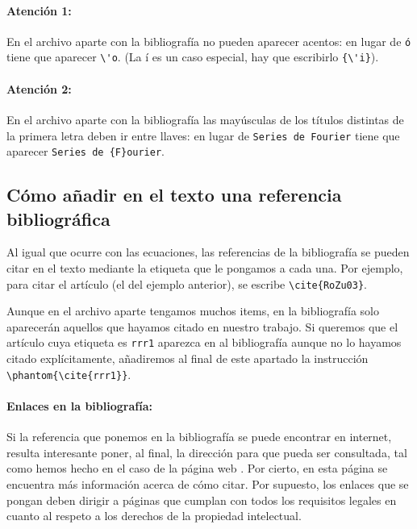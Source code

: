 \documentclass[a4paper,12pt]{article}
\begin{document}
{\paragraph{Atención 1:} En el archivo aparte con la bibliografía no pueden aparecer acentos: en lugar de \verb|ó| tiene que aparecer \verb|\'o|. (La í es un caso especial, hay que escribirlo \verb|{\'i}|).
\paragraph{Atención 2:}  En el archivo aparte con la bibliografía  las mayúsculas de los títulos distintas de la primera letra deben ir entre llaves: en lugar de \verb|Series de Fourier| tiene que aparecer \verb|Series de {F}ourier|.

\subsection{Cómo añadir en el texto una referencia bibliográfica}


Al igual que ocurre con las ecuaciones, las referencias de la bibliografía se pueden citar en el texto mediante la etiqueta que le pongamos a cada una. Por ejemplo, para citar el artículo \cite{RoZu03} (el del ejemplo anterior),  se escribe \verb|\cite{RoZu03}|.

Aunque en el archivo aparte tengamos muchos items, en la bibliografía solo aparecerán aquellos que hayamos citado en nuestro trabajo. 
Si queremos que el artículo cuya etiqueta es \verb|rrr1| aparezca en al bibliografía aunque no lo hayamos citado explícitamente, añadiremos al final de este apartado la instrucción \verb|\phantom{\cite{rrr1}}|.




\paragraph{Enlaces en la bibliografía:} Si la referencia que ponemos en la bibliografía se puede encontrar en internet, resulta interesante poner, al final, la dirección para que pueda ser consultada, tal como hemos hecho en el caso de la página web \cite{biblatex}. Por cierto, en esta página se encuentra más información acerca de cómo citar. 
Por supuesto, los enlaces que se pongan deben dirigir a páginas que cumplan con todos los requisitos legales en cuanto al respeto a los derechos de la propiedad intelectual.




}
\end{document}
